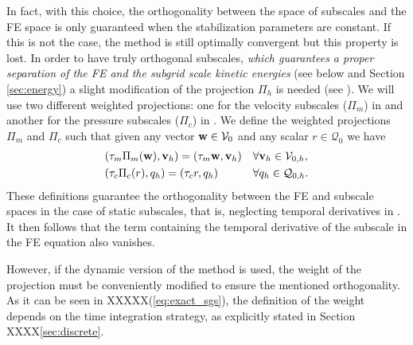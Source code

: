 In fact, with this choice, the orthogonality between the space of subscales and the FE space is only guaranteed when the stabilization parameters are constant. If this is not the case, the method is still optimally convergent \cite{Codina_2008a} but this property is lost. In order to have truly orthogonal subscales, \emph{which guarantees a proper separation of the FE and the subgrid scale kinetic energies} (see below and Section \ref{sec:energy}) a slight modification of the projection $\Pi_h$ is needed (see \cite{Codina_2008a}). We will use two different weighted projections: one for the velocity subscales ($\Pi_m$) in  and another for the pressure subscales ($\Pi_c$) in . We define the weighted projections $\Pi_m$ and $\Pi_c$ such that given any vector ${\bf w}\in\mathcal{V}_0$ and any scalar $r\in\mathcal{Q}_0$ we have
\begin{align}
\label{eq-C2_vms_Pi_tau_m}
&(\tau_m\Pi_m({\bf w}),{\bf v}_h)=(\tau_m{\bf w},{\bf v}_h)&&\forall{\bf v}_h\in\mathcal{V}_{0,h},\\
\label{eq-C2_vms_Pi_tau_c}
&(\tau_c\Pi_c(r),q_h)=(\tau_cr,q_h)&&\forall q_h\in\mathcal{Q}_{0,h}.
\end{align}
These definitions guarantee the orthogonality between the FE and subscale spaces in the case of static subscales, that is, neglecting temporal derivatives in . It then follows that the term containing the temporal derivative of the subscale in the FE equation  also vanishes.

However, if the dynamic version of the method is used, the weight of the projection  must be conveniently modified to ensure the mentioned orthogonality. As it can be seen in XXXXX(\ref{eq:exact_sgs}), the definition of the weight depends on the time integration strategy, as explicitly stated in Section XXXX\ref{sec:discrete}.